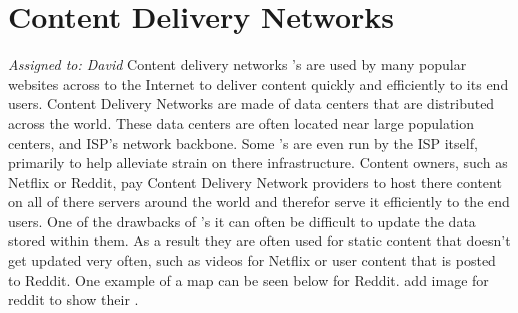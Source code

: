 \section{Content Delivery Networks}\label{sec:background_cnds}
\textit{Assigned to: David}
Content delivery networks \cdn's are used by many popular websites across to the Internet to deliver content quickly and efficiently to its end users. Content Delivery Networks are made of data centers that are distributed across the world. These data centers are often located near large population centers, and ISP's network backbone. Some \cdn's are even run by the ISP itself, primarily to help alleviate strain on there infrastructure.  Content owners, such as Netflix or Reddit, pay Content Delivery Network providers to host there content on all of there servers around the world and therefor serve it efficiently to the end users. \cite{} One of the drawbacks of \cdn's it can often be difficult to update the data stored within them. As a result they are often used for static content that doesn't get updated very often, such as videos for Netflix or user content that is posted to Reddit. One example of a map can be seen below for Reddit. \todo add image for reddit to show their \cdn.